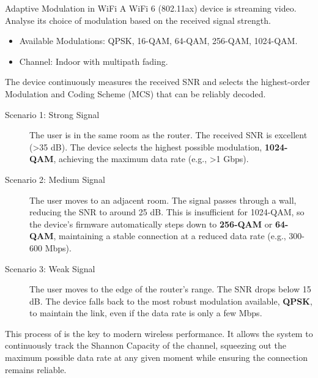 \begin{workedexample}{Adaptive Modulation in WiFi}
     A WiFi 6 (802.11ax) device is streaming video. Analyse its choice of modulation based on the received signal strength.
    
    \begin{itemize}
        \item Available Modulations: QPSK, 16-QAM, 64-QAM, 256-QAM, 1024-QAM.
        \item Channel: Indoor with multipath fading.
    \end{itemize}
    
    The device continuously measures the received SNR and selects the highest-order Modulation and Coding Scheme (MCS) that can be reliably decoded.
    \begin{description}
        \item[Scenario 1: Strong Signal] The user is in the same room as the router. The received SNR is excellent (>35 dB). The device selects the highest possible modulation, \textbf{1024-QAM}, achieving the maximum data rate (e.g., >1 Gbps).
        \item[Scenario 2: Medium Signal] The user moves to an adjacent room. The signal passes through a wall, reducing the SNR to around 25 dB. This is insufficient for 1024-QAM, so the device's firmware automatically steps down to \textbf{256-QAM} or \textbf{64-QAM}, maintaining a stable connection at a reduced data rate (e.g., 300-600 Mbps).
        \item[Scenario 3: Weak Signal] The user moves to the edge of the router's range. The SNR drops below 15 dB. The device falls back to the most robust modulation available, \textbf{QPSK}, to maintain the link, even if the data rate is only a few Mbps.
    \end{description}
     This process of  is the key to modern wireless performance. It allows the system to continuously track the Shannon Capacity of the channel, squeezing out the maximum possible data rate at any given moment while ensuring the connection remains reliable.
\end{workedexample}


